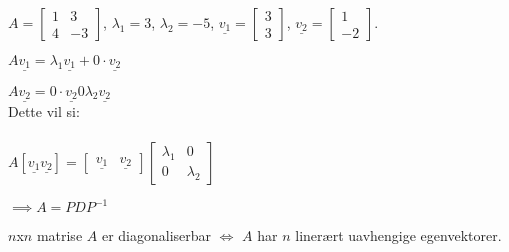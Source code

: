 \documentclass[11pt, a4paper, norsk]{article}
\begin{document}
        \begin{Example}{}{}
            $A = \begin{bmatrix}
                1 & 3 \\
                4 & -3
            \end{bmatrix}$, $\lambda_1 = 3$, $\lambda_2 = -5$, $\underline{v_1} = \begin{bmatrix}
                3 \\
                3
            \end{bmatrix}$, $\underline{v_2} = \begin{bmatrix}
                1 \\
                -2
            \end{bmatrix}$.

            $A\underline{v_1} = \lambda_1\underline{v_1} + 0\cdot \underline{v_2}$

            $A\underline{v_2} = 0\cdot \underline{v_2} 0 \lambda_2 \underline{v_2}$
            \\

            Dette vil si:
            \\
            \\
            $A[\underline{v_1} \underline{v_2}] = \begin{bmatrix}
                \underline{v_1} & \underline{v_2}
            \end{bmatrix}\begin{bmatrix}
                \lambda_1 & 0 \\
                0 & \lambda_2
            \end{bmatrix}$

            $\implies A = PDP^{-1}$
        \end{Example}

        \begin{Theorem}{}{}
            $n$x$n$ matrise $A$ er diagonaliserbar $\iff$ $A$ har $n$ linerært uavhengige egenvektorer.
        \end{Theorem}
\end{document}
